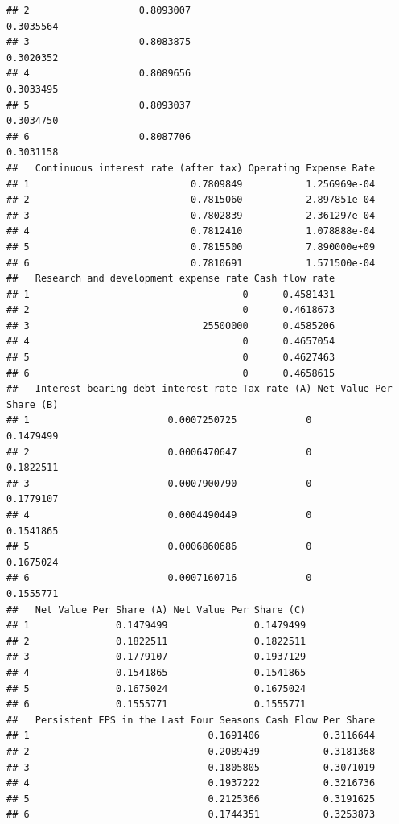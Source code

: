 \documentclass[
]{book}
\begin{document}
\begin{verbatim}
## 2                   0.8093007                                   0.3035564
## 3                   0.8083875                                   0.3020352
## 4                   0.8089656                                   0.3033495
## 5                   0.8093037                                   0.3034750
## 6                   0.8087706                                   0.3031158
##   Continuous interest rate (after tax) Operating Expense Rate
## 1                            0.7809849           1.256969e-04
## 2                            0.7815060           2.897851e-04
## 3                            0.7802839           2.361297e-04
## 4                            0.7812410           1.078888e-04
## 5                            0.7815500           7.890000e+09
## 6                            0.7810691           1.571500e-04
##   Research and development expense rate Cash flow rate
## 1                                     0      0.4581431
## 2                                     0      0.4618673
## 3                              25500000      0.4585206
## 4                                     0      0.4657054
## 5                                     0      0.4627463
## 6                                     0      0.4658615
##   Interest-bearing debt interest rate Tax rate (A) Net Value Per Share (B)
## 1                        0.0007250725            0               0.1479499
## 2                        0.0006470647            0               0.1822511
## 3                        0.0007900790            0               0.1779107
## 4                        0.0004490449            0               0.1541865
## 5                        0.0006860686            0               0.1675024
## 6                        0.0007160716            0               0.1555771
##   Net Value Per Share (A) Net Value Per Share (C)
## 1               0.1479499               0.1479499
## 2               0.1822511               0.1822511
## 3               0.1779107               0.1937129
## 4               0.1541865               0.1541865
## 5               0.1675024               0.1675024
## 6               0.1555771               0.1555771
##   Persistent EPS in the Last Four Seasons Cash Flow Per Share
## 1                               0.1691406           0.3116644
## 2                               0.2089439           0.3181368
## 3                               0.1805805           0.3071019
## 4                               0.1937222           0.3216736
## 5                               0.2125366           0.3191625
## 6                               0.1744351           0.3253873

\end{verbatim}
\end{document}
